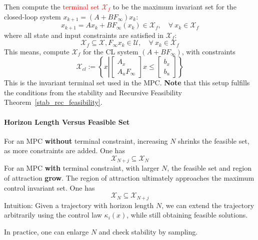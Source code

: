 Then compute the \textcolor{red}{terminal set $\mathcal{X}_f$} to be the maximum invariant set for the closed-loop system $x_{k+1} = (A+BF_\infty)x_k$:
\begin{equation*}
    x_{k+1} = Ax_k + BF_\infty(x_k) \in \mathcal{X}_f, \quad \forall \: x_k \in \mathcal{X}_f
\end{equation*}
where all state and input constraints are satisfied in $\mathcal{X}_f$:
\begin{equation*}
    \mathcal{X}_f \subseteq \mathcal{X}, F_\infty x_k \in \mathcal{U}, \quad \forall \: x_k \in \mathcal{X}_f
\end{equation*}
This means, compute $\mathcal{X}_f$ for the CL system $(A+BF_{\infty})$, with constraints
\begin{equation*}
    \mathcal{X}_{cl} := \left\{x \left|
    \begin{bmatrix}
        A_x \\ A_u F_\infty
    \end{bmatrix}
    x \leq
    \begin{bmatrix}
        b_x \\
        b_u
    \end{bmatrix}\right.\right\}
\end{equation*}
This is the invariant terminal set used in the MPC.
\newpar{}
\textbf{Note} that this setup fulfills the conditions from the stability and Recursive Feasibility Theorem~\ref{stab_rec_feasibility}.

\paragraph{Horizon Length Versus Feasible Set}

For an MPC \textbf{without} terminal constraint, increasing $N$ shrinks the feasible set, as more constraints are added. One has
\begin{equation*}
    \mathcal{X}_{N+j} \subseteq \mathcal{X}_N
\end{equation*}
\newpar{}
For an MPC \textbf{with} terminal constraint, with larger $N$, the feasible set and region of attraction \textbf{grow}. The region of attraction ultimately approaches the maximum control invariant set. One has
\begin{equation*}
    \mathcal{X}_{N} \subseteq \mathcal{X}_{N+j}
\end{equation*}
Intuition: Given a trajectory with horizon length $N$, we can extend the trajectory arbitrarily using the control law $\kappa_i(x)$, while still obtaining feasible solutions.

\newpar{}

In practice, one can enlarge $N$ and check stability by sampling.   %
